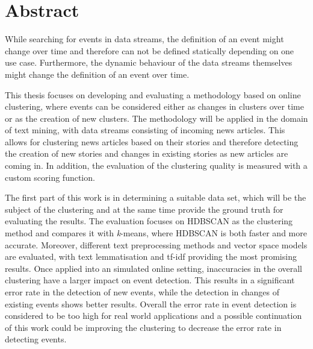 
\section*{Abstract}


While searching for events in data streams, the definition of an event might change over time and therefore can not be defined statically depending on one use case. Furthermore, the dynamic behaviour of the data streams themselves might change the definition of an event over time.

This thesis focuses on developing and evaluating a methodology based on online clustering, where events can be considered either as changes in clusters over time or as the creation of new clusters. The methodology will be applied in the domain of text mining, with data streams consisting of incoming news articles. This allows for clustering news articles based on their stories and therefore detecting the creation of new stories and changes in existing stories as new  articles are coming in. In addition, the evaluation of the clustering quality is measured with a custom scoring function.

The first part of this work is in determining a suitable data set, which will be the subject of the clustering and at the same time provide the ground truth for evaluating the results. The evaluation focuses on HDBSCAN as the clustering method and compares it with \textit{k}-means, where HDBSCAN is both faster and more accurate. Moreover, different text preprocessing methods and vector space models are evaluated, with text lemmatisation and tf-idf providing the most promising results. Once applied into an simulated online setting, inaccuracies in the overall clustering have a larger impact on event detection. This results in a significant error rate in the detection of new events, while the detection in changes of existing events shows better results. Overall the error rate in event detection is considered to be too high for real world applications and a possible continuation of this work could be improving the clustering to decrease the error rate in detecting events.



